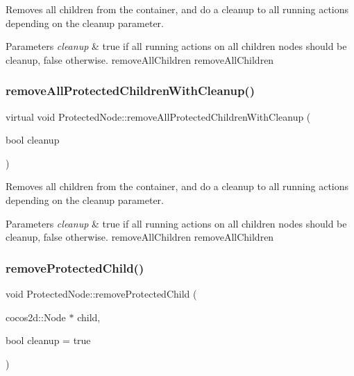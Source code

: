 Removes all children from the container, and do a cleanup to all running actions depending on the cleanup parameter.


\begin{DoxyParams}{Parameters}
{\em cleanup} & true if all running actions on all children nodes should be cleanup, false otherwise.  remove\+All\+Children  remove\+All\+Children \\
\hline
\end{DoxyParams}
\mbox{\label{classProtectedNode_ab28b415ead8bc9d1426567d75f6b6f0b}} 
\subsubsection{\texorpdfstring{remove\+All\+Protected\+Children\+With\+Cleanup()}{removeAllProtectedChildrenWithCleanup()}\hspace{0.1cm}{\footnotesize\ttfamily [2/2]}}
{\footnotesize\ttfamily virtual void Protected\+Node\+::remove\+All\+Protected\+Children\+With\+Cleanup (\begin{DoxyParamCaption}\item[{bool}]{cleanup }\end{DoxyParamCaption})\hspace{0.3cm}{\ttfamily [virtual]}}

Removes all children from the container, and do a cleanup to all running actions depending on the cleanup parameter.


\begin{DoxyParams}{Parameters}
{\em cleanup} & true if all running actions on all children nodes should be cleanup, false otherwise.  remove\+All\+Children  remove\+All\+Children \\
\hline
\end{DoxyParams}
\mbox{\label{classProtectedNode_a0d5d30ee7194e85b5b607b428ab366ab}} 
\subsubsection{\texorpdfstring{remove\+Protected\+Child()}{removeProtectedChild()}\hspace{0.1cm}{\footnotesize\ttfamily [1/2]}}
{\footnotesize\ttfamily void Protected\+Node\+::remove\+Protected\+Child (\begin{DoxyParamCaption}\item[{cocos2d\+::\+Node $\ast$}]{child,  }\item[{bool}]{cleanup = {\ttfamily true} }\end{DoxyParamCaption})\hspace{0.3cm}{\ttfamily [virtual]}}

